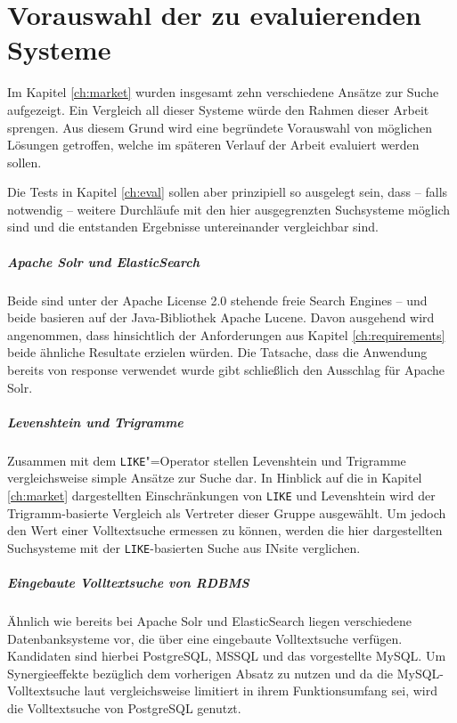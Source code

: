 \chapter{Vorauswahl der zu evaluierenden Systeme}
\label{ch:choose}

Im Kapitel \ref{ch:market} wurden insgesamt zehn verschiedene Ansätze zur Suche aufgezeigt. Ein Vergleich all dieser Systeme würde den Rahmen dieser Arbeit sprengen. Aus diesem Grund wird eine begründete Vorauswahl von möglichen Lösungen getroffen, welche im späteren Verlauf der Arbeit evaluiert werden sollen.

Die Tests in Kapitel \ref{ch:eval} sollen aber prinzipiell so ausgelegt sein, dass -- falls notwendig -- weitere Durchläufe mit den hier ausgegrenzten Suchsysteme möglich sind und die entstanden Ergebnisse untereinander vergleichbar sind.


\paragraph{Apache Solr und ElasticSearch}
Beide sind unter der Apache License 2.0 stehende freie Search Engines -- und beide basieren auf der Java-Bibliothek Apache Lucene. Davon ausgehend wird angenommen, dass hinsichtlich der Anforderungen aus Kapitel \ref{ch:requirements} beide ähnliche Resultate erzielen würden. Die Tatsache, dass die Anwendung bereits von response verwendet wurde gibt schließlich den Ausschlag für Apache Solr.

\paragraph{Levenshtein und Trigramme}
Zusammen mit dem \texttt{LIKE}"=Operator stellen Levenshtein und Trigramme vergleichsweise simple Ansätze zur Suche dar. In Hinblick auf die in Kapitel \ref{ch:market} dargestellten Einschränkungen von \texttt{LIKE} und Levenshtein wird der Trigramm-basierte Vergleich als Vertreter dieser Gruppe ausgewählt. Um jedoch den Wert einer Volltextsuche ermessen zu können, werden die hier dargestellten Suchsysteme mit der \texttt{LIKE}-basierten Suche aus INsite verglichen.

\paragraph{Eingebaute Volltextsuche von RDBMS}
Ähnlich wie bereits bei Apache Solr und ElasticSearch liegen verschiedene Datenbanksysteme vor, die über eine eingebaute Volltextsuche verfügen. Kandidaten sind hierbei PostgreSQL, MSSQL und das vorgestellte MySQL. Um Synergieeffekte bezüglich dem vorherigen Absatz zu nutzen und da die MySQL-Volltextsuche laut \cite{Belaid.2015} vergleichsweise limitiert in ihrem Funktionsumfang sei, wird die Volltextsuche von PostgreSQL genutzt.


